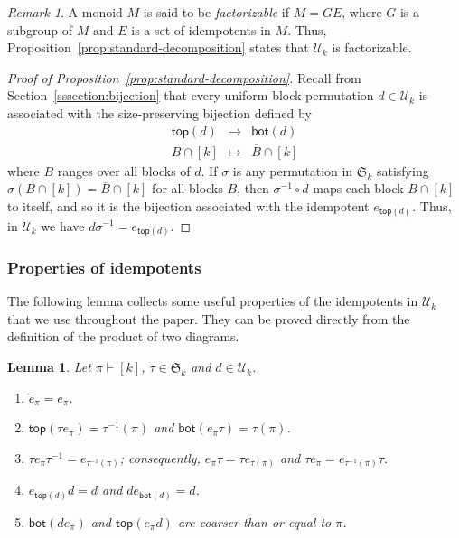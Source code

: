 \documentclass[10pt]{amsart}
\newtheorem{lemma}[theorem]{Lemma}
\theoremstyle{definition}
\theoremstyle{remark}
\newtheorem{remark}[theorem]{Remark}
\newcommand{\defncolor}{\color{darkred}}
\newcommand{\defn}[1]{{\defncolor\emph{#1}}} %
\begin{document}
\begin{remark}
    A monoid $M$ is said to be \defn{factorizable} if $M = G E$, where $G$ is
    a subgroup of $M$ and $E$ is a set of idempotents in $M$.
    Thus, Proposition~\ref{prop:standard-decomposition} states that
    $\mathcal{U}_k$ is factorizable.
\end{remark}

\begin{proof}[Proof of Proposition~\ref{prop:standard-decomposition}]
    Recall from Section~\ref{sssection:bijection} that every uniform block
    permutation $d \in \mathcal{U}_k$ is associated with the size-preserving
    bijection defined by
    \begin{eqnarray*}
        \mathsf{top}(d) & \longrightarrow & \mathsf{bot}(d)\\
        B \cap [k] & \longmapsto & \overline{B} \cap [k]
    \end{eqnarray*}
    where $B$ ranges over all blocks of $d$.
    If $\sigma$ is any permutation in $\mathfrak{S}_k$ satisfying
    $\sigma(B \cap [k]) = \overline{B} \cap [k]$ for all blocks $B$,
    then $\sigma^{-1} \circ d$ maps each block $B \cap [k]$ to itself,
    and so it is the bijection associated with the idempotent $e_{\mathsf{top}(d)}$.
    Thus, in $\mathcal{U}_k$ we have $d \sigma^{-1} = e_{\mathsf{top}(d)}$.
\end{proof}

\subsubsection{Properties of idempotents}

The following lemma collects some useful properties of the idempotents in
$\mathcal{U}_k$ that we use throughout the paper.
They can be proved directly from the definition of the product of two diagrams.

\begin{lemma}\label{lem:eproperties}
Let $\pi\vdash [k]$, $\tau\in \mathfrak{S}_k$ and $d \in \mathcal{U}_k$.
\begin{enumerate}[label=(\alph*)]
\item $\widetilde{e}_\pi = e_\pi$.
\item $\mathsf{top}(\tau e_\pi) = \tau^{-1}(\pi)$ and $\mathsf{bot}(e_\pi\tau) = \tau(\pi)$.
\item $\tau e_\pi \tau^{-1} = e_{\tau^{-1}(\pi)}$; consequently, $e_\pi \tau = \tau e_{\tau(\pi)}$ and $\tau e_\pi  =  e_{\tau^{-1}(\pi)}\tau$.
\item $e_{\mathsf{top}(d)} d = d$ and $de_{\mathsf{bot}(d)} = d$.
\item $\mathsf{bot}(d e_\pi)$ and $\mathsf{top}(e_\pi d)$ are coarser than or equal to $\pi$.
\end{enumerate}
\end{lemma}
\end{document}
